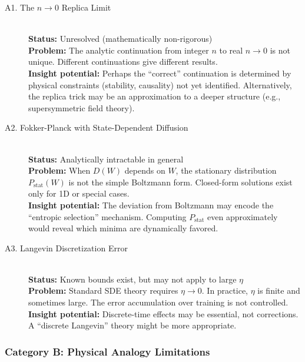 \documentclass[
  journal=largetwo,
  year=2025,
  volume=37,
]{cup-journal}
\begin{document}
\begin{description}
    \item[A1. The $n \to 0$ Replica Limit] \hfill \\
    \textbf{Status:} Unresolved (mathematically non-rigorous) \\
    \textbf{Problem:} The analytic continuation from integer $n$ to real $n \to 0$ is not unique. Different continuations give different results. \\
    \textbf{Insight potential:} Perhaps the ``correct'' continuation is determined by physical constraints (stability, causality) not yet identified. Alternatively, the replica trick may be an approximation to a deeper structure (e.g., supersymmetric field theory).
    
    \item[A2. Fokker-Planck with State-Dependent Diffusion] \hfill \\
    \textbf{Status:} Analytically intractable in general \\
    \textbf{Problem:} When $D(W)$ depends on $W$, the stationary distribution $P_{\text{stat}}(W)$ is not the simple Boltzmann form. Closed-form solutions exist only for 1D or special cases. \\
    \textbf{Insight potential:} The deviation from Boltzmann may encode the ``entropic selection'' mechanism. Computing $P_{\text{stat}}$ even approximately would reveal which minima are dynamically favored.
    
    \item[A3. Langevin Discretization Error] \hfill \\
    \textbf{Status:} Known bounds exist, but may not apply to large $\eta$ \\
    \textbf{Problem:} Standard SDE theory requires $\eta \to 0$. In practice, $\eta$ is finite and sometimes large. The error accumulation over training is not controlled. \\
    \textbf{Insight potential:} Discrete-time effects may be essential, not corrections. A ``discrete Langevin'' theory might be more appropriate.
\end{description}

\subsubsection{Category B: Physical Analogy Limitations}
\end{document}
